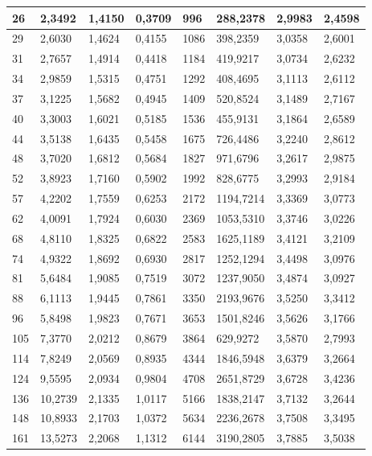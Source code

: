 \documentclass[letterpaper,titlepage,12pt]{report}
\begin{document}
\begin{table}[H]
\begin{tiny}
{\begin{tabular}{|
>{\columncolor[HTML]{FFFFC7}}l |l|l|l|
>{\columncolor[HTML]{FFFFC7}}l |l|l|l|}
26 & 2,3492 & 1,4150 & 0,3709 & 996 & 288,2378 & 2,9983 & 2,4598 \\ \hline
29 & 2,6030 & 1,4624 & 0,4155 & 1086 & 398,2359 & 3,0358 & 2,6001 \\ \hline
31 & 2,7657 & 1,4914 & 0,4418 & 1184 & 419,9217 & 3,0734 & 2,6232 \\ \hline
34 & 2,9859 & 1,5315 & 0,4751 & 1292 & 408,4695 & 3,1113 & 2,6112 \\ \hline
37 & 3,1225 & 1,5682 & 0,4945 & 1409 & 520,8524 & 3,1489 & 2,7167 \\ \hline
40 & 3,3003 & 1,6021 & 0,5185 & 1536 & 455,9131 & 3,1864 & 2,6589 \\ \hline
44 & 3,5138 & 1,6435 & 0,5458 & 1675 & 726,4486 & 3,2240 & 2,8612 \\ \hline
48 & 3,7020 & 1,6812 & 0,5684 & 1827 & 971,6796 & 3,2617 & 2,9875 \\ \hline
52 & 3,8923 & 1,7160 & 0,5902 & 1992 & 828,6775 & 3,2993 & 2,9184 \\ \hline
57 & 4,2202 & 1,7559 & 0,6253 & 2172 & 1194,7214 & 3,3369 & 3,0773 \\ \hline
62 & 4,0091 & 1,7924 & 0,6030 & 2369 & 1053,5310 & 3,3746 & 3,0226 \\ \hline
68 & 4,8110 & 1,8325 & 0,6822 & 2583 & 1625,1189 & 3,4121 & 3,2109 \\ \hline
74 & 4,9322 & 1,8692 & 0,6930 & 2817 & 1252,1294 & 3,4498 & 3,0976 \\ \hline
81 & 5,6484 & 1,9085 & 0,7519 & 3072 & 1237,9050 & 3,4874 & 3,0927 \\ \hline
88 & 6,1113 & 1,9445 & 0,7861 & {\color[HTML]{FE0000} 3350} & {\color[HTML]{FE0000} 2193,9676} & {\color[HTML]{FE0000} 3,5250} & {\color[HTML]{FE0000} 3,3412} \\ \hline
96 & 5,8498 & 1,9823 & 0,7671 & 3653 & 1501,8246 & 3,5626 & 3,1766 \\ \hline
105 & 7,3770 & 2,0212 & 0,8679 & 3864 & 629,9272 & 3,5870 & 2,7993 \\ \hline
114 & 7,8249 & 2,0569 & 0,8935 & 4344 & 1846,5948 & 3,6379 & 3,2664 \\ \hline
124 & 9,5595 & 2,0934 & 0,9804 & 4708 & 2651,8729 & 3,6728 & 3,4236 \\ \hline
136 & 10,2739 & 2,1335 & 1,0117 & 5166 & 1838,2147 & 3,7132 & 3,2644 \\ \hline
148 & 10,8933 & 2,1703 & 1,0372 & 5634 & 2236,2678 & 3,7508 & 3,3495 \\ \hline
161 & 13,5273 & 2,2068 & 1,1312 & 6144 & 3190,2805 & 3,7885 & 3,5038 \\ \hline

\end{tabular}}
\end{tiny}
\end{table}
\end{document}
